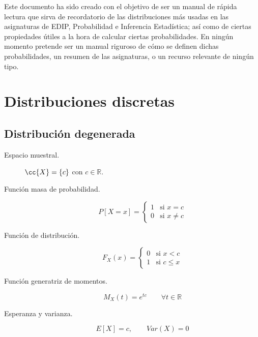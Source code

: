 Este documento ha sido creado con el objetivo de ser un manual de rápida lectura que sirva de recordatorio de las distribuciones más usadas en las asignaturas de EDIP, Probabilidad e Inferencia Estadística; así como de ciertas propiedades útiles a la hora de calcular ciertas probabilidades. En ningún momento pretende ser un manual riguroso de cómo se definen dichas probabilidades, un resumen de las asignaturas, o un recurso relevante de ningún tipo.

\section{Distribuciones discretas}
\subsection{Distribución degenerada}
\begin{description}
    \item [Espacio muestral.] $\cc{X} = \{c\}$ con $c\in \mathbb{R}$.
    \item [Función masa de probabilidad.] 
        \begin{equation*}
            P[X=x] = \left\{\begin{array}{ll}
                1 & \text{si\ } x=c \\
                0 & \text{si\ } x\neq c
            \end{array}\right. 
        \end{equation*}
    \item [Función de distribución.] 
        \begin{equation*}
            F_X(x) = \left\{\begin{array}{ll}
                0 & \text{si\ } x<c  \\
                1 & \text{si\ } c\leq x
            \end{array}\right. 
        \end{equation*}
    \item [Función generatriz de momentos.] 
        \begin{equation*}
            M_X(t) = e^{tc} \qquad \forall t\in \mathbb{R}
        \end{equation*}
    \item [Esperanza y varianza.] 
        \begin{equation*}
            E[X] = c, \qquad Var(X) = 0
        \end{equation*}
\end{description}

